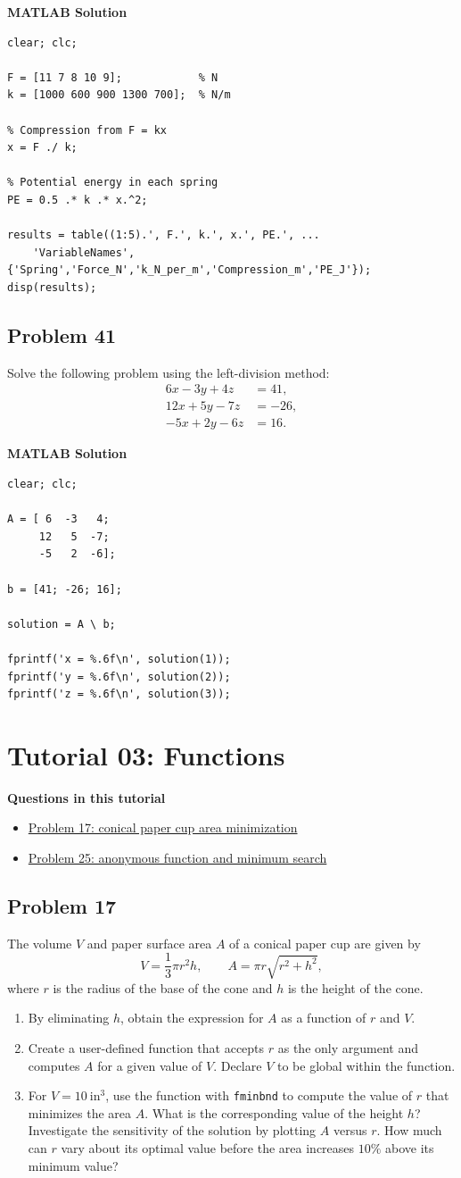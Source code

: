 \documentclass[12pt]{article}
\newcommand{\tutorialsection}[2]{%
    \clearpage
    \phantomsection
    \hypertarget{#1}{}%
    \section*{#2}
}
\newcommand{\questiontitle}[2]{%
    \phantomsection
    \hypertarget{#1}{}%
    \subsection*{#2}
}
\newcommand{\solutiontitle}{\noindent\textbf{MATLAB Solution}}
\newcommand{\minitoc}[1]{%
    \noindent\textbf{Questions in this tutorial}
    \begin{itemize}[leftmargin=1.5em, itemsep=0.2em]
        #1
    \end{itemize}
}
\begin{document}
\solutiontitle
\begin{lstlisting}
clear; clc;

F = [11 7 8 10 9];            % N
k = [1000 600 900 1300 700];  % N/m

% Compression from F = kx
x = F ./ k;

% Potential energy in each spring
PE = 0.5 .* k .* x.^2;

results = table((1:5).', F.', k.', x.', PE.', ...
    'VariableNames', {'Spring','Force_N','k_N_per_m','Compression_m','PE_J'});
disp(results);
\end{lstlisting}

\questiontitle{tut2-q41}{Problem 41}
Solve the following problem using the left-division method:
\[
\begin{aligned}
6x - 3y + 4z &= 41,\\
12x + 5y - 7z &= -26,\\
-5x + 2y - 6z &= 16.
\end{aligned}
\]

\solutiontitle
\begin{lstlisting}
clear; clc;

A = [ 6  -3   4;
     12   5  -7;
     -5   2  -6];

b = [41; -26; 16];

solution = A \ b;

fprintf('x = %.6f\n', solution(1));
fprintf('y = %.6f\n', solution(2));
fprintf('z = %.6f\n', solution(3));
\end{lstlisting}

\tutorialsection{tut3}{Tutorial 03: Functions}
\minitoc{
    \item \hyperlink{tut3-q17}{Problem 17: conical paper cup area minimization}
    \item \hyperlink{tut3-q25}{Problem 25: anonymous function and minimum search}
}

\questiontitle{tut3-q17}{Problem 17}
The volume $V$ and paper surface area $A$ of a conical paper cup are given by
\[
V = \frac{1}{3}\pi r^{2}h,
\qquad
A = \pi r\sqrt{r^{2} + h^{2}},
\]
where $r$ is the radius of the base of the cone and $h$ is the height of the cone.
\begin{enumerate}[label=\alph*.]
    \item By eliminating $h$, obtain the expression for $A$ as a function of $r$ and $V$.
    \item Create a user-defined function that accepts $r$ as the only argument and computes $A$ for a given value of $V$. Declare $V$ to be global within the function.
    \item For $V = 10~\text{in}^{3}$, use the function with \texttt{fminbnd} to compute the value of $r$ that minimizes the area $A$. What is the corresponding value of the height $h$? Investigate the sensitivity of the solution by plotting $A$ versus $r$. How much can $r$ vary about its optimal value before the area increases $10\%$ above its minimum value?
\end{enumerate}
\end{document}
